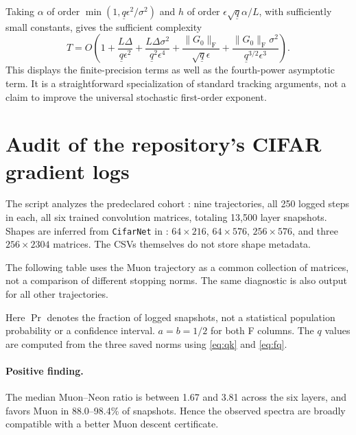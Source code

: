 \documentclass[11pt]{article}
\newcommand{\F}[1]{\lVert #1\rVert_{\mathrm F}}
\begin{document}
Taking $\alpha$ of order
$\min(1,\underline q\epsilon^2/\sigma^2)$ and
$h$ of order $\epsilon\sqrt{\underline q}\alpha/L$, with sufficiently
small constants, gives the sufficient complexity
\begin{equation}\label{eq:ema-complexity}
 T=O\!\left(1+
 \frac{L\Delta}{\underline q\epsilon^2}
 +\frac{L\Delta\sigma^2}{\underline q^2\epsilon^4}
 +\frac{\F{G_0}}{\sqrt{\underline q}\epsilon}
 +\frac{\F{G_0}\sigma^2}{\underline q^{3/2}\epsilon^3}\right).
\end{equation}
This displays the finite-precision terms as well as the fourth-power
asymptotic term. It is a straightforward specialization of standard
tracking arguments, not a claim to improve the universal stochastic
first-order exponent.

\section{Audit of the repository's CIFAR gradient logs}\label{sec:audit}

The script analyzes the predeclared cohort
:
nine trajectories, all 250 logged steps in each, all six trained convolution
matrices, totaling 13,500 layer snapshots. Shapes are inferred from
\texttt{CifarNet} in :
$64\times216$, $64\times576$, $256\times576$, and three
$256\times2304$ matrices. The CSVs themselves do not store shape metadata.

The following table uses the Muon trajectory as a common collection of
matrices, not a comparison of different stopping norms. The same diagnostic
is also output for all other trajectories.
\begin{center}\small

\end{center}
Here $\Pr$ denotes the fraction of logged snapshots, not a statistical
population probability or a confidence interval. $a=b=1/2$ for both F
columns. The $q$ values are computed from the three saved norms using
\eqref{eq:qk} and \eqref{eq:fq}.

\paragraph{Positive finding.}
The median Muon--Neon ratio is between 1.67 and 3.81 across the six layers,
and favors Muon in 88.0--98.4\% of snapshots. Hence the observed spectra
are broadly compatible with a better Muon descent certificate.
\end{document}
